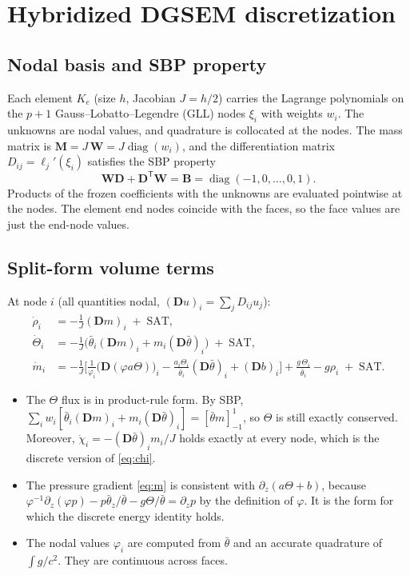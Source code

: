 \documentclass[11pt,a4paper]{article}
\newcommand{\thb}{\bar\theta}
\newcommand{\D}{\bm D}
\begin{document}
\section{Hybridized DGSEM discretization}
\subsection{Nodal basis and SBP property}
Each element $K_e$ (size $h$, Jacobian $J=h/2$) carries the Lagrange polynomials on the $p+1$
Gauss--Lobatto--Legendre (GLL) nodes $\xi_i$ with weights $w_i$. The unknowns are nodal values,
and quadrature is collocated at the nodes. The mass matrix is
$\bm M=J\,\bm W=J\operatorname{diag}(w_i)$, and the differentiation matrix
$D_{ij}=\ell_j'(\xi_i)$ satisfies the SBP property~\cite{kopriva,gassner2013}
\begin{equation}
\bm W\D+\D^{\mathsf T}\bm W=\bm B=\operatorname{diag}(-1,0,\dots,0,1).
\end{equation}
Products of the frozen coefficients with the unknowns are evaluated pointwise at the nodes. The
element end nodes coincide with the faces, so the face values are just the end-node values.

\subsection{Split-form volume terms}
At node $i$ (all quantities nodal, $(\D u)_i=\sum_jD_{ij}u_j$):
\begin{align}
\dot\rho_i &= -\tfrac1J(\D m)_i \;+\;\text{SAT},\\
\dot\Theta_i &= -\tfrac1J\big(\thb_i(\D m)_i+m_i(\D\thb)_i\big) \;+\;\text{SAT},\label{eq:Th}\\
\dot m_i &= -\tfrac1J\Big[\tfrac{1}{\varphi_i}\big(\D(\varphi a\Theta)\big)_i
 -\tfrac{a_i\Theta_i}{\thb_i}(\D\thb)_i+(\D b)_i\Big]+\frac{g\,\Theta_i}{\thb_i}-g\rho_i
 \;+\;\text{SAT}.\label{eq:m}
\end{align}
\begin{itemize}
\item The $\Theta$ flux is in product-rule form. By SBP,
$\sum_iw_i[\thb_i(\D m)_i+m_i(\D\thb)_i]=[\thb m]_{-1}^{1}$, so $\Theta$ is still exactly
conserved. Moreover, $\dot\chi_i=-(\D\thb)_i m_i/J$ holds exactly at every node, which is the
discrete version of \eqref{eq:chi}.
\item The pressure gradient \eqref{eq:m} is consistent with $\partial_z(a\Theta+b)$, because
$\varphi^{-1}\partial_z(\varphi p)-p\thb_z/\thb-g\Theta/\thb=\partial_zp$ by the definition of
$\varphi$. It is the form for which the discrete energy identity holds.
\item The nodal values $\varphi_i$ are computed from $\thb$ and an accurate quadrature of
$\int g/c^2$. They are continuous across faces.
\end{itemize}
\end{document}
